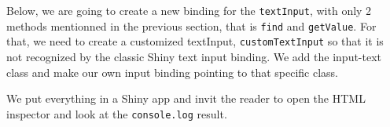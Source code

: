 \documentclass[]{book}
\newenvironment{Shaded}{\begin{snugshade}}{\end{snugshade}}
\newcommand{\ControlFlowTok}[1]{\textcolor[rgb]{0.13,0.29,0.53}{\textbf{#1}}}
\newcommand{\DataTypeTok}[1]{\textcolor[rgb]{0.13,0.29,0.53}{#1}}
\newcommand{\KeywordTok}[1]{\textcolor[rgb]{0.13,0.29,0.53}{\textbf{#1}}}
\newcommand{\NormalTok}[1]{#1}
\newcommand{\OperatorTok}[1]{\textcolor[rgb]{0.81,0.36,0.00}{\textbf{#1}}}
\newcommand{\OtherTok}[1]{\textcolor[rgb]{0.56,0.35,0.01}{#1}}
\newcommand{\StringTok}[1]{\textcolor[rgb]{0.31,0.60,0.02}{#1}}
\begin{document}
Below, we are going to create a new binding for the \texttt{textInput}, with only 2 methods mentionned in the previous section, that is \texttt{find} and \texttt{getValue}. For that, we need to create a customized textInput, \texttt{customTextInput} so that it is not recognized by the classic Shiny text input binding. We add the input-text class and make our own input binding pointing to that specific class.

\begin{Shaded}
\end{Shaded}

We put everything in a Shiny app and invit the reader to open the HTML inspector and look at the \texttt{console.log} result.
\end{document}
